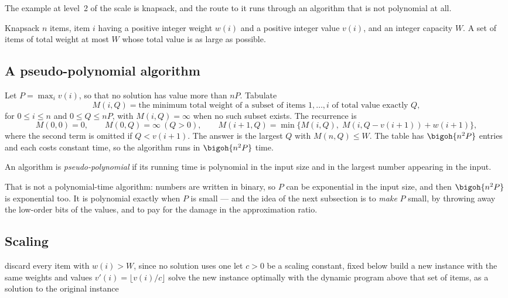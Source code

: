 The example at level~2 of the scale is knapsack, and the route to it runs
through an algorithm that is not polynomial at all.

\begin{probdef}{Knapsack}
  \instance $n$ items, item $i$ having a positive integer weight $w(i)$ and a
  positive integer value $v(i)$, and an integer capacity $W$.
  \question A set of items of total weight at most $W$ whose total value is as
  large as possible.
\end{probdef}

\subsection{A pseudo-polynomial algorithm}

Let $P = \max_i v(i)$, so that no solution has value more than $nP$. Tabulate
\[ M(i,Q) = \text{the minimum total weight of a subset of items } 1,\dots,i
   \text{ of total value exactly } Q, \]
for $0 \le i \le n$ and $0 \le Q \le nP$, with $M(i,Q) = \infty$ when no such
subset exists. The recurrence is
\[ M(0,0) = 0, \qquad M(0,Q) = \infty \ (Q > 0), \qquad
   M(i+1,Q) = \min\bigl\{ M(i,Q),\; M(i,Q-v(i+1)) + w(i+1) \bigr\}, \]
where the second term is omitted if $Q < v(i+1)$. The answer is the largest $Q$
with $M(n,Q) \le W$. The table has $\bigoh{n^2 P}$ entries and each costs
constant time, so the algorithm runs in $\bigoh{n^2 P}$ time.

\begin{definition}\label{def:pseudo-polynomial}
An algorithm is \emph{pseudo-polynomial} if its running time is polynomial in
the input size and in the largest number appearing in the input.
\end{definition}

That is not a polynomial-time algorithm: numbers are written in binary, so $P$
can be exponential in the input size, and then $\bigoh{n^2P}$ is exponential
too. It is polynomial exactly when $P$ is small --- and the idea of the next
subsection is to \emph{make} $P$ small, by throwing away the low-order bits of
the values, and to pay for the damage in the approximation ratio.

\subsection{Scaling}

\begin{algorithm}[ht]
\caption{FPTAS for }
\label{alg:knapsack-fptas}
\begin{algorithmic}[1]
  \State discard every item with $w(i) > W$, since no solution uses one
  \State let $c > 0$ be a scaling constant, fixed below
  \State build a new instance with the same weights and values
         $v'(i) = \lfloor v(i)/c \rfloor$
  \State solve the new instance optimally with the dynamic program above
  \State \Return that set of items, as a solution to the original instance
\end{algorithmic}
\end{algorithm}

